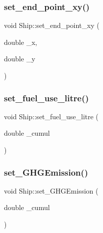 \mbox{\label{class_ship_a131d5e3de4dc210a89e53c6c39dbaa29}} 
\subsubsection{\texorpdfstring{set\_end\_point\_xy()}{set\_end\_point\_xy()}}
{\footnotesize\ttfamily void Ship\+::set\+\_\+end\+\_\+point\+\_\+xy (\begin{DoxyParamCaption}\item[{double}]{\+\_\+x,  }\item[{double}]{\+\_\+y }\end{DoxyParamCaption})}

\mbox{\label{class_ship_a78811fbbb53086b1c336ec758480140b}} 
\subsubsection{\texorpdfstring{set\_fuel\_use\_litre()}{set\_fuel\_use\_litre()}}
{\footnotesize\ttfamily void Ship\+::set\+\_\+fuel\+\_\+use\+\_\+litre (\begin{DoxyParamCaption}\item[{double}]{\+\_\+cumul }\end{DoxyParamCaption})}

\mbox{\label{class_ship_a5a5d9299ad16c3ccc82ee597d7416187}} 
\subsubsection{\texorpdfstring{set\_GHGEmission()}{set\_GHGEmission()}}
{\footnotesize\ttfamily void Ship\+::set\+\_\+\+G\+H\+G\+Emission (\begin{DoxyParamCaption}\item[{double}]{\+\_\+cumul }\end{DoxyParamCaption})}

\mbox{\label{class_ship_a1fb49123ca111896ee2e61f15e106bd6}} 
